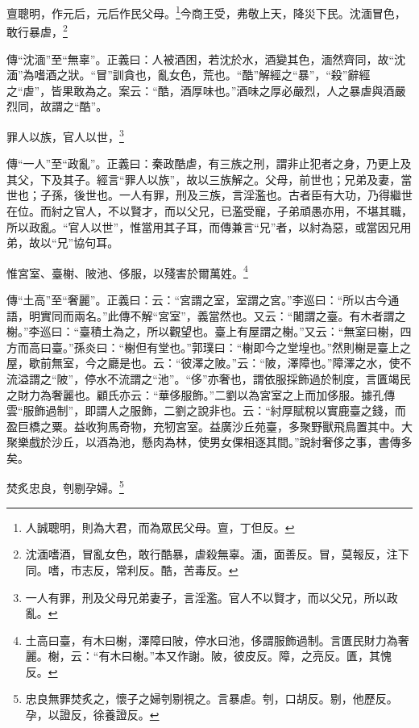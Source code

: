 亶聰明，作元后，元后作民父母。\footnote{人誠聰明，則為大君，而為眾民父母。亶，丁但反。}今商王受，弗敬上天，降災下民。沈湎冒色，敢行暴虐，\footnote{沈湎嗜酒，冒亂女色，敢行酷暴，虐殺無辜。湎，面善反。冒，莫報反，注下同。嗜，市志反，常利反。酷，苦毒反。}

{\noindent\shu{}\fzkt 傳“沈湎”至“無辜”。正義曰：人被酒困，若沈於水，酒變其色，湎然齊同，故“沈湎”為嗜酒之狀。“冒”訓貪也，亂女色，荒也。“酷”解經之“暴”，“殺”辭經之“虐”，皆果敢為之。案云：“酷，酒厚味也。”酒味之厚必嚴烈，人之暴虐與酒嚴烈同，故謂之“酷”。 \par}

罪人以族，官人以世，\footnote{一人有罪，刑及父母兄弟妻子，言淫濫。官人不以賢才，而以父兄，所以政亂。}

{\noindent\zhuan{}\fzbyks 傳“一人”至“政亂”。正義曰：秦政酷虐，有三族之刑，謂非止犯者之身，乃更上及其父，下及其子。經言“罪人以族”，故以三族解之。父母，前世也；兄弟及妻，當世也；子孫，後世也。一人有罪，刑及三族，言淫濫也。古者臣有大功，乃得繼世在位。而紂之官人，不以賢才，而以父兄，已濫受寵，子弟頑愚亦用，不堪其職，所以政亂。“官人以世”，惟當用其子耳，而傳兼言“兄”者，以紂為惡，或當因兄用弟，故以“兄”協句耳。 \par}

惟宮室、臺榭、陂池、侈服，以殘害於爾萬姓。\footnote{土高曰臺，有木曰榭，澤障曰陂，停水曰池，侈謂服飾過制。言匱民財力為奢麗。榭，云：“有木曰榭。”本又作謝。陂，彼皮反。障，之亮反。匱，其愧反。}

{\noindent\zhuan{}\fzbyks 傳“土高”至“奢麗”。正義曰：云：“宮謂之室，室謂之宮。”李巡曰：“所以古今通語，明實同而兩名。”此傳不解“宮室”，義當然也。又云：“闍謂之臺。有木者謂之榭。”李巡曰：“臺積土為之，所以觀望也。臺上有屋謂之榭。”又云：“無室曰榭，四方而高曰臺。”孫炎曰：“榭但有堂也。”郭璞曰：“榭即今之堂堭也。”然則榭是臺上之屋，歇前無室，今之廳是也。云：“彼澤之陂。”云：“陂，澤障也。”障澤之水，使不流溢謂之“陂”，停水不流謂之“池”。“侈”亦奢也，謂依服採飾過於制度，言匱竭民之財力為奢麗也。顧氏亦云：“華侈服飾。”二劉以為宮室之上而加侈服。據孔傳雲“服飾過制”，即謂人之服飾，二劉之說非也。云：“紂厚賦稅以實鹿臺之錢，而盈巨橋之粟。益收狗馬奇物，充牣宮室。益廣沙丘苑臺，多聚野獸飛鳥置其中。大聚樂戲於沙丘，以酒為池，懸肉為林，使男女倮相逐其間。”說紂奢侈之事，書傳多矣。 \par}

焚炙忠良，刳剔孕婦。\footnote{忠良無罪焚炙之，懷子之婦刳剔視之。言暴虐。刳，口胡反。剔，他歷反。孕，以證反，徐養證反。}

